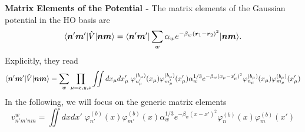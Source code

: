 {\bf Matrix Elements of the Potential - } The matrix elements of the Gaussian 
potential in the HO basis are
\begin{equation}
\langle \boldsymbol{n}'\boldsymbol{m}' | \hat{V} | \boldsymbol{n}\boldsymbol{m}\rangle
=
\langle \boldsymbol{n}'\boldsymbol{m}' | 
\sum_{w} \alpha_{w} e^{-\beta_{w}(\boldsymbol{r}_{1} - \boldsymbol{r}_{2})^{2}} 
| \boldsymbol{n}\boldsymbol{m}\rangle.
\end{equation}
Explicitly, they read
\begin{equation}
\langle \boldsymbol{n}'\boldsymbol{m}' | \hat{V} | \boldsymbol{n}\boldsymbol{m}\rangle
= \sum_{w} \prod_{\mu=x,y,z}
\iint dx_{\mu}dx'_{\mu} \; \varphi^{(b_{\mu})}_{n'_{\mu}}(x_{\mu})\varphi^{(b_{\mu})}_{m'_{\mu}}(x'_{\mu})
\alpha_{w}^{1/3} e^{-\beta_{w}(x_{\mu} - x'_{\mu})^{2}} 
\varphi^{(b_{\mu})}_{n_{\mu}}(x_{\mu})\varphi^{(b_{\mu})}_{m_{\mu}}(x'_{\mu})
\end{equation}
In the following, we will focus on the generic matrix elements
\begin{equation}
v_{n'm'nm}^{w}
= \iint dxdx' \; \varphi^{(b)}_{n'}(x)\varphi^{(b)}_{m'}(x)
\alpha_{w}^{1/3} e^{-\beta_{w}(x - x')^{2}} 
\varphi^{(b)}_{n}(x)\varphi^{(b)}_{m}(x')
\label{eq:1DME}
\end{equation}

